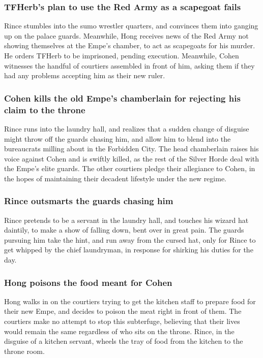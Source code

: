 \subsubsection{\Gls{TFHerb}'s plan to use the Red Army as a scapegoat fails}
\Gls{Rince} stumbles into the sumo wrestler quarters, and convinces them into ganging up on the
palace guards. Meanwhile, \Gls{Hong} receives news of the Red Army not showing themselves at the
\Gls{Empe}'s chamber, to act as scapegoats for his murder. He orders \Gls{TFHerb} to be imprisoned,
pending execution. Meanwhile, \Gls{Cohen} witnesses the handful of courtiers assembled in front of
him, asking them if they had any problems accepting him as their new ruler.

\subsubsection{\Gls{Cohen} kills the old \Gls{Empe}'s chamberlain for rejecting his claim to the
    throne}
\Gls{Rince} runs into the laundry hall, and realizes that a sudden change of disguise might throw
off the guards chasing him, and allow him to blend into the bureaucrats milling about in the
Forbidden City. The head chamberlain raises his voice against \Gls{Cohen} and is swiftly killed,
as the rest of the Silver Horde deal with the \Gls{Empe}'s elite guards. The other courtiers pledge
their allegiance to \Gls{Cohen}, in the hopes of maintaining their decadent lifestyle under the new
regime.

\subsubsection{\Gls{Rince} outsmarts the guards chasing him}
\Gls{Rince} pretends to be a servant in the laundry hall, and touches his wizard hat daintily, to
make a show of falling down, bent over in great pain. The guards pursuing him take the hint, and
run away from the cursed hat, only for \Gls{Rince} to get whipped by the chief laundryman, in
response for shirking his duties for the day.

\subsubsection{\Gls{Hong} poisons the food meant for \Gls{Cohen}}
\Gls{Hong} walks in on the courtiers trying to get the kitchen staff to prepare food for their
new \Gls{Empe}, and decides to poison the meat right in front of them. The courtiers make no attempt
to stop this subterfuge, believing that their lives would remain the same regardless of who sits on
the throne. \Gls{Rince}, in the disguise of a kitchen servant, wheels the tray of food from the
kitchen to the throne room.

